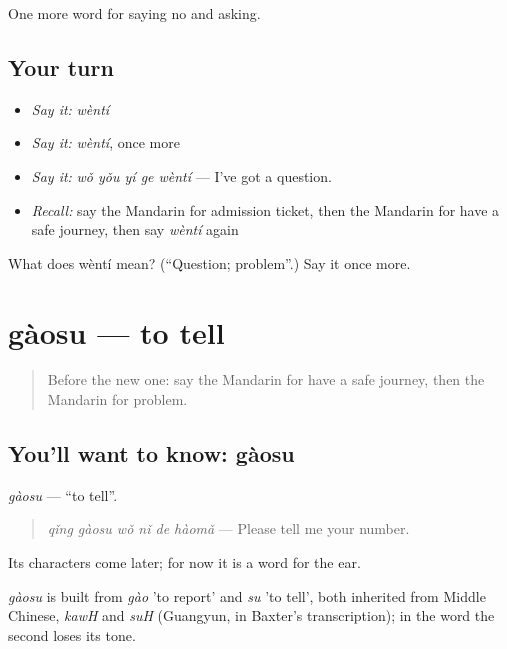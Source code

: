 \begin{grammarlens}[title={What you've built}]
One more word for saying no and asking.
\end{grammarlens}

\subsection*{Your turn}
\begin{itemize}
\raggedright
  \item \emph{Say it:} \emph{wèntí}
  \item \emph{Say it:} \emph{wèntí}, once more
  \item \emph{Say it:} \emph{wǒ yǒu yí ge wèntí} — I've got a question.
  \item \emph{Recall:} say the Mandarin for admission ticket, then the Mandarin for have a safe journey, then say \emph{wèntí} again
\end{itemize}

\begin{tcolorbox}[breakable,colback=teal!4,colframe=teal!35!black,title={Before you move on}]
What does wèntí mean? (\textquotedblleft{}Question; problem\textquotedblright{}.) Say it once more.
\end{tcolorbox}
\section[gàosu]{gàosu — to tell}

\label{lesson:ZH-C214-gaosu}



\begin{quote}
Before the new one: say the Mandarin for have a safe journey, then the Mandarin for problem.
\end{quote}

\subsection*{You'll want to know: gàosu}
\emph{gàosu} — \textquotedblleft{}to tell\textquotedblright{}.

\begin{quote}
\emph{qǐng gàosu wǒ nǐ de hàomǎ} — Please tell me your number.
\end{quote}

Its characters come later; for now it is a word for the ear.

\begin{cousinweb}
\emph{gàosu} is built from \emph{gào} 'to report' and \emph{su} 'to tell', both inherited from Middle Chinese, \emph{kawH} and \emph{suH} (Guangyun, in Baxter's transcription); in the word the second loses its tone.
\end{cousinweb}

